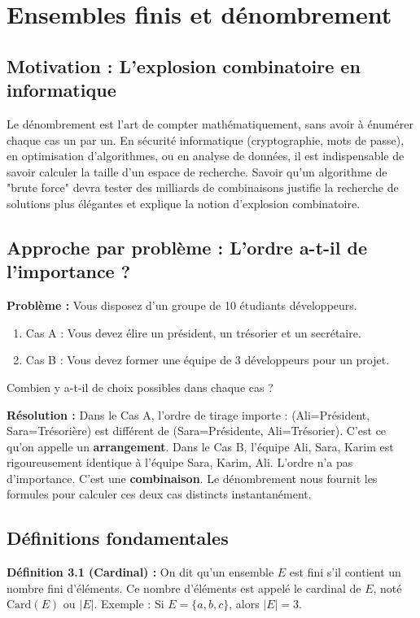 \documentclass[12pt,a4paper]{report}
\begin{document}
\section{Ensembles finis et dénombrement}

\subsection{Motivation : L'explosion combinatoire en informatique}
Le dénombrement est l'art de compter mathématiquement, sans avoir à énumérer chaque cas un par un. En sécurité informatique (cryptographie, mots de passe), en optimisation d'algorithmes, ou en analyse de données, il est indispensable de savoir calculer la taille d'un espace de recherche. Savoir qu'un algorithme de "brute force" devra tester des milliards de combinaisons justifie la recherche de solutions plus élégantes et explique la notion d'explosion combinatoire.

\subsection{Approche par problème : L'ordre a-t-il de l'importance ?}
\textbf{Problème :} Vous disposez d'un groupe de 10 étudiants développeurs. 
\begin{enumerate}
    \item Cas A : Vous devez élire un président, un trésorier et un secrétaire.
    \item Cas B : Vous devez former une équipe de 3 développeurs pour un projet.
\end{enumerate}
Combien y a-t-il de choix possibles dans chaque cas ?

\textbf{Résolution :} 
Dans le Cas A, l'ordre de tirage importe : (Ali=Président, Sara=Trésorière) est différent de (Sara=Présidente, Ali=Trésorier). C'est ce qu'on appelle un \textbf{arrangement}.
Dans le Cas B, l'équipe {Ali, Sara, Karim} est rigoureusement identique à l'équipe {Sara, Karim, Ali}. L'ordre n'a pas d'importance. C'est une \textbf{combinaison}.
Le dénombrement nous fournit les formules pour calculer ces deux cas distincts instantanément.

\subsection{Définitions fondamentales}

\textbf{Définition 3.1 (Cardinal) :} 
On dit qu'un ensemble $E$ est fini s'il contient un nombre fini d'éléments. Ce nombre d'éléments est appelé le cardinal de $E$, noté $\text{Card}(E)$ ou $|E|$.
Exemple : Si $E = \{a, b, c\}$, alors $|E| = 3$.
\end{document}

